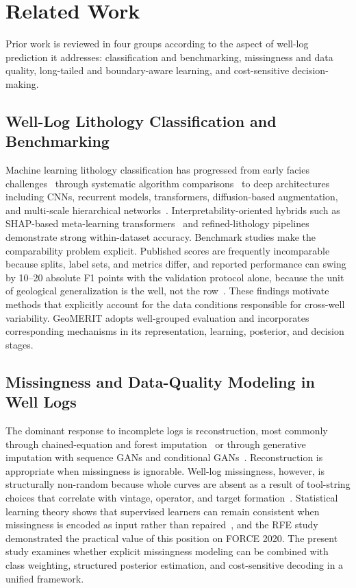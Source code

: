 \documentclass[bdcc,article,submit,pdftex,moreauthors]{Definitions/mdpi}
\begin{document}
\section{Related Work}
\label{sec:related}
Prior work is reviewed in four groups according to the aspect of well-log prediction it
addresses: classification and benchmarking, missingness and data quality, long-tailed and
boundary-aware learning, and cost-sensitive decision-making.

\subsection{Well-Log Lithology Classification and Benchmarking}
Machine learning lithology classification has progressed from early facies
challenges~\cite{hall2016facies} through systematic algorithm
comparisons~\cite{merembayev2021,dev2019formation} to deep architectures including CNNs,
recurrent models, transformers, diffusion-based augmentation, and multi-scale hierarchical
networks~\cite{wang2024dnnlitho,chen2025geological,zhao2025diffusion,zhan2025mchgeo}.
Interpretability-oriented hybrids such as SHAP-based meta-learning
transformers~\cite{sun2024shapmeta,lundberg2017shap} and refined-lithology
pipelines~\cite{shi2023refined} demonstrate strong within-dataset accuracy. Benchmark studies
make the comparability problem explicit. Published scores are frequently incomparable because
splits, label sets, and metrics differ, and reported performance can swing by 10--20 absolute
F1 points with the validation protocol alone, because the unit of geological generalization
is the well, not the row~\cite{carvalho2026benchmark,rosenblatt2024}. These findings motivate
methods that explicitly account for the data conditions responsible for cross-well
variability. GeoMERIT adopts well-grouped evaluation and incorporates corresponding
mechanisms in its representation, learning, posterior, and decision stages.

\subsection{Missingness and Data-Quality Modeling in Well Logs}
The dominant response to incomplete logs is reconstruction, most commonly through chained-equation
and forest imputation~\cite{vanbuuren2011mice,stekhoven2012missforest} or through generative
imputation with sequence GANs and conditional GANs~\cite{liu2025wellgan,xie2024cgan}. Reconstruction is
appropriate when missingness is ignorable. Well-log missingness, however, is structurally
non-random because whole curves are absent as a result of tool-string choices that correlate
with vintage, operator, and target formation~\cite{chen2026rfe}. Statistical learning theory shows
that supervised learners can remain consistent when missingness is encoded as input rather
than repaired~\cite{little2019stats,josse2024missing}, and the RFE
study~\cite{chen2026rfe} demonstrated the practical value of this position on FORCE 2020.
The present study examines whether explicit missingness modeling can be combined with class
weighting, structured posterior estimation, and cost-sensitive decoding in a unified
framework.
\end{document}
